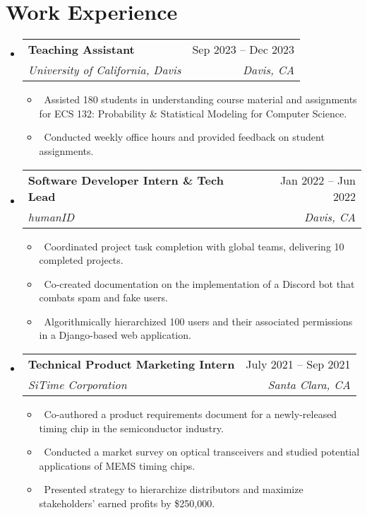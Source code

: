 \documentclass[letterpaper,10pt]{article}
\makeatletter
\newcommand{\resumeItem}[1]{\item\small{#1}}
\newcommand{\resumeSubheading}[4]{
\vspace{-1pt}\item
  \begin{tabular*}{0.97\textwidth}[t]{l@{\extracolsep{\fill}}r}
    \textbf{#1} & #2 \\
    \textit{#3} & \textit{#4} \\
  \end{tabular*}\vspace{-7pt}
}
\newcommand{\resumeSubHeadingList}{\begin{itemize}[leftmargin=0.15in, label={}]}
\newcommand{\resumeSubHeadingListEnd}{\end{itemize}}
\makeatother
\begin{document}
\section{Work Experience}
\resumeSubHeadingList
  \resumeSubheading
      {Teaching Assistant}{Sep 2023 -- Dec 2023}
      {University of California, Davis}{Davis, CA}
      \resumeSubHeadingList
          \resumeItem{\textbullet\ Assisted 180 students in understanding course material and assignments for ECS 132: Probability \& Statistical Modeling for Computer Science.}
          \resumeItem{\textbullet\ Conducted weekly office hours and provided feedback on student assignments.}
      \resumeSubHeadingListEnd
  \resumeSubheading
      {Software Developer Intern \& Tech Lead}{Jan 2022 -- Jun 2022}
      {humanID}{Davis, CA}
      \resumeSubHeadingList
          \resumeItem{\textbullet\ Coordinated project task completion with global teams, delivering 10 completed projects.}
          \resumeItem{\textbullet\ Co-created documentation on the implementation of a Discord bot that combats spam and fake users.}
          \resumeItem{\textbullet\ Algorithmically hierarchized 100 users and their associated permissions in a Django-based web application.}
      \resumeSubHeadingListEnd
  \resumeSubheading
      {Technical Product Marketing Intern}{July 2021 -- Sep 2021}
      {SiTime Corporation}{Santa Clara, CA}
      \resumeSubHeadingList
          \resumeItem{\textbullet\ Co-authored a product requirements document for a newly-released timing chip in the semiconductor industry.}
          \resumeItem{\textbullet\ Conducted a market survey on optical transceivers and studied potential applications of MEMS timing chips.}
          \resumeItem{\textbullet\ Presented strategy to hierarchize distributors and maximize stakeholders' earned profits by \$250,000.}
      \resumeSubHeadingListEnd
\resumeSubHeadingListEnd

\end{document}
